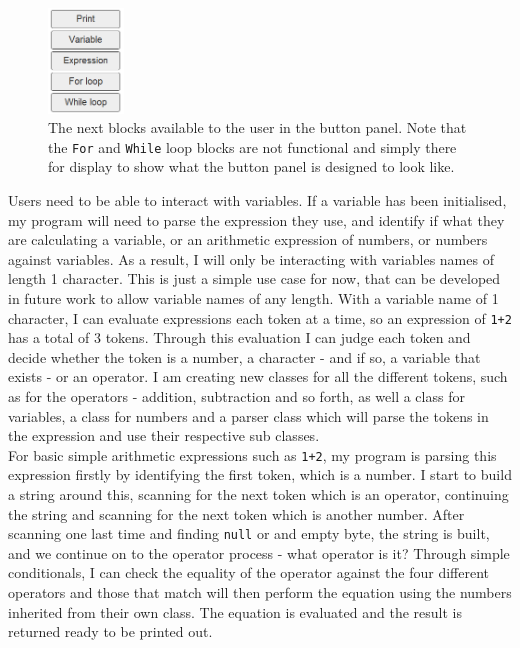 \documentclass[a4paper, 12pt]{article}
\begin{document}
            \clearpage
            \begin{figure}[h]
                \centering
                \includegraphics[width=20mm]{updated_blocks.png}
                \caption{The next blocks available to the user in the button panel. Note that the
                \texttt{For} and \texttt{While} loop blocks are not functional and simply there
                for display to show what the button panel is designed to look like.}
            \end{figure}

            Users need to be able to interact with variables. If a variable has been initialised,
            my program will need to parse the expression they use, and identify if what they are
            calculating a variable, or an arithmetic expression of numbers, or numbers against
            variables. As a result, I will only be interacting with variables names of length
            1 character. This is just a simple use case for now, that can be developed in future
            work to allow variable names of any length. With a variable name of 1 character, I can
            evaluate expressions each token at a time, so an expression of \texttt{1+2} has a total
            of 3 tokens. Through this evaluation I can judge each token and decide whether the token
            is a number, a character - and if so, a variable that exists - or an operator. I am
            creating new classes for all the different tokens, such as for the operators - addition,
            subtraction and so forth, as well a class for variables, a class for numbers and a parser
            class which will parse the tokens in the expression and use their respective sub classes. \\

            For basic simple arithmetic expressions such as \texttt{1+2}, my program is parsing this
            expression firstly by identifying the first token, which is a number. I start to build a
            string around this, scanning for the next token which is an operator, continuing the string
            and scanning for the next token which is another number. After scanning one last time and
            finding \texttt{null} or and empty byte, the string is built, and we continue on to the
            operator process - what operator is it? Through simple conditionals, I can check the equality
            of the operator against the four different operators and those that match will then perform
            the equation using the numbers inherited from their own class. The equation is evaluated and
            the result is returned ready to be printed out.
\end{document}
